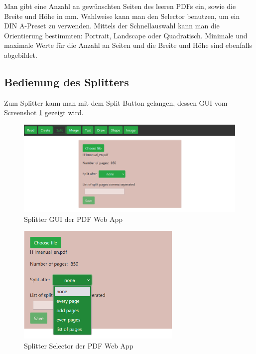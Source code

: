 Man gibt eine Anzahl an gewünschten Seiten des leeren PDFs ein, sowie die Breite und Höhe in mm. Wahlweise kann man den Selector benutzen, um ein DIN A-Preset zu verwenden. Mittels der Schnellauswahl kann man die Orientierung bestimmten: Portrait, Landscape oder Quadratisch. Minimale und maximale Werte für die Anzahl an Seiten und die Breite und Höhe sind ebenfalls abgebildet. 


\subsection{Bedienung des Splitters}
Zum Splitter kann man mit dem Split Button gelangen, dessen GUI vom Screenshot \ref{fig:splitter} gezeigt wird.

\begin{figure}[!htbp]
	\centering
	\includegraphics[width=1\textwidth]{"images/splitter.png"}
	\caption{Splitter GUI der PDF Web App}
	\label{fig:splitter}
\end{figure}

\begin{figure}[!htbp]
	\centering
	\includegraphics[width=0.7\textwidth]{"images/splitter2.png"}
	\caption{Splitter Selector der PDF Web App}
	\label{fig:splitter2}
\end{figure}

